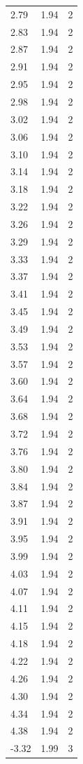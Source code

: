\begin{longtable}{lrr}
  2.79 & 1.94 & 2 \\
  2.83 & 1.94 & 2 \\
  2.87 & 1.94 & 2 \\
  2.91 & 1.94 & 2 \\
  2.95 & 1.94 & 2 \\
  2.98 & 1.94 & 2 \\
  3.02 & 1.94 & 2 \\
  3.06 & 1.94 & 2 \\
  3.10 & 1.94 & 2 \\
  3.14 & 1.94 & 2 \\
  3.18 & 1.94 & 2 \\
  3.22 & 1.94 & 2 \\
  3.26 & 1.94 & 2 \\
  3.29 & 1.94 & 2 \\
  3.33 & 1.94 & 2 \\
  3.37 & 1.94 & 2 \\
  3.41 & 1.94 & 2 \\
  3.45 & 1.94 & 2 \\
  3.49 & 1.94 & 2 \\
  3.53 & 1.94 & 2 \\
  3.57 & 1.94 & 2 \\
  3.60 & 1.94 & 2 \\
  3.64 & 1.94 & 2 \\
  3.68 & 1.94 & 2 \\
  3.72 & 1.94 & 2 \\
  3.76 & 1.94 & 2 \\
  3.80 & 1.94 & 2 \\
  3.84 & 1.94 & 2 \\
  3.87 & 1.94 & 2 \\
  3.91 & 1.94 & 2 \\
  3.95 & 1.94 & 2 \\
  3.99 & 1.94 & 2 \\
  4.03 & 1.94 & 2 \\
  4.07 & 1.94 & 2 \\
  4.11 & 1.94 & 2 \\
  4.15 & 1.94 & 2 \\
  4.18 & 1.94 & 2 \\
  4.22 & 1.94 & 2 \\
  4.26 & 1.94 & 2 \\
  4.30 & 1.94 & 2 \\
  4.34 & 1.94 & 2 \\
  4.38 & 1.94 & 2 \\
  -3.32 & 1.99 & 3 \\

\end{longtable}
